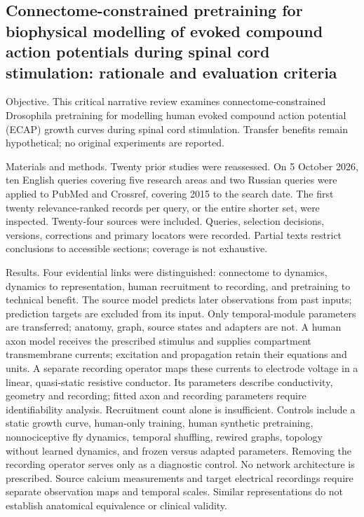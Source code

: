 \documentclass[12pt,a4paper]{article}
\begin{document}
\subsection*{Connectome-constrained pretraining for biophysical modelling of evoked compound action potentials during spinal cord stimulation: rationale and evaluation criteria}
Objective. This critical narrative review examines connectome-constrained Drosophila pretraining for modelling human evoked compound action potential (ECAP) growth curves during spinal cord stimulation. Transfer benefits remain hypothetical; no original experiments are reported.\par
Materials and methods. Twenty prior studies were reassessed. On 5 October 2026, ten English queries covering five research areas and two Russian queries were applied to PubMed and Crossref, covering 2015 to the search date. The first twenty relevance-ranked records per query, or the entire shorter set, were inspected. Twenty-four sources were included. Queries, selection decisions, versions, corrections and primary locators were recorded. Partial texts restrict conclusions to accessible sections; coverage is not exhaustive.\par
Results. Four evidential links were distinguished: connectome to dynamics, dynamics to representation, human recruitment to recording, and pretraining to technical benefit. The source model predicts later observations from past inputs; prediction targets are excluded from its input. Only temporal-module parameters are transferred; anatomy, graph, source states and adapters are not. A human axon model receives the prescribed stimulus and supplies compartment transmembrane currents; excitation and propagation retain their equations and units. A separate recording operator maps these currents to electrode voltage in a linear, quasi-static resistive conductor. Its parameters describe conductivity, geometry and recording; fitted axon and recording parameters require identifiability analysis. Recruitment count alone is insufficient. Controls include a static growth curve, human-only training, human synthetic pretraining, nonnociceptive fly dynamics, temporal shuffling, rewired graphs, topology without learned dynamics, and frozen versus adapted parameters. Removing the recording operator serves only as a diagnostic control. No network architecture is prescribed. Source calcium measurements and target electrical recordings require separate observation maps and temporal scales. Similar representations do not establish anatomical equivalence or clinical validity.\par
\end{document}
